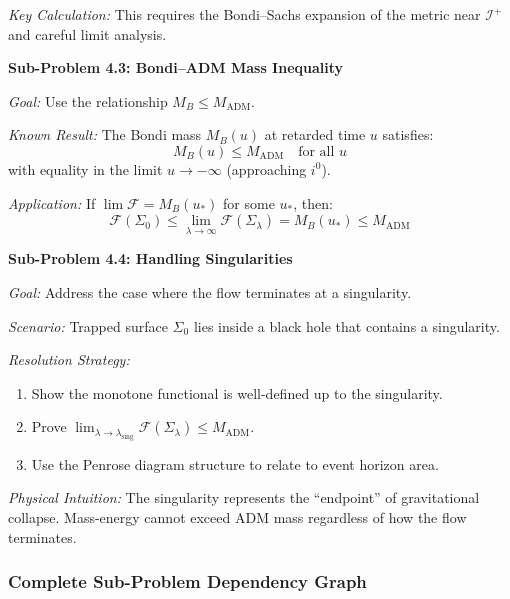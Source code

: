 \textit{Key Calculation:} This requires the Bondi--Sachs expansion of the metric near $\mathscr{I}^+$ and careful limit analysis.

\textbf{Sub-Problem 4.3: Bondi--ADM Mass Inequality}

\textit{Goal:} Use the relationship $M_B \leq M_{\mathrm{ADM}}$.

\textit{Known Result:} The Bondi mass $M_B(u)$ at retarded time $u$ satisfies:
\begin{equation}
    M_B(u) \leq M_{\mathrm{ADM}} \quad \text{for all } u
\end{equation}
with equality in the limit $u \to -\infty$ (approaching $i^0$).

\textit{Application:} If $\lim \mathcal{F} = M_B(u_*)$ for some $u_*$, then:
\begin{equation}
    \mathcal{F}(\Sigma_0) \leq \lim_{\lambda\to\infty} \mathcal{F}(\Sigma_\lambda) = M_B(u_*) \leq M_{\mathrm{ADM}}
\end{equation}

\textbf{Sub-Problem 4.4: Handling Singularities}

\textit{Goal:} Address the case where the flow terminates at a singularity.

\textit{Scenario:} Trapped surface $\Sigma_0$ lies inside a black hole that contains a singularity.

\textit{Resolution Strategy:}
\begin{enumerate}
    \item Show the monotone functional is well-defined up to the singularity.
    \item Prove $\lim_{\lambda \to \lambda_{\text{sing}}} \mathcal{F}(\Sigma_\lambda) \leq M_{\mathrm{ADM}}$.
    \item Use the Penrose diagram structure to relate to event horizon area.
\end{enumerate}

\textit{Physical Intuition:} The singularity represents the ``endpoint'' of gravitational collapse. Mass-energy cannot exceed ADM mass regardless of how the flow terminates.

\subsubsection{Complete Sub-Problem Dependency Graph}

